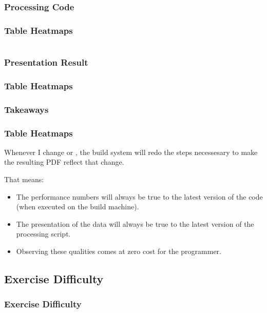{\subsubsection{Processing Code}
\begin{frame}[fragile]
  \frametitle{Table Heatmaps }
  \vspace{0mm}
  
  \begin{multicols}{2}
    \inputminted[fontsize=\tiny]{python}{../src/table_heatmap/process.py}
  \end{multicols}
\end{frame}

\subsubsection{Presentation Result}
\begin{frame}[fragile]
  \frametitle{Table Heatmaps }
  \vspace{24mm}
  \scalebox{0.9}{
    
  }
\end{frame}

\subsubsection{Takeaways}
\begin{frame}[fragile]
  \frametitle{Table Heatmaps }
  \vspace{3mm}
  Whenever I change  or , the build system will redo the steps necessesary to make the resulting PDF reflect that change.
  
  \vspace{5mm}
  That means:
  \begin{itemize}
    \item The performance numbers will always be true to the latest version of the code (when executed on the build machine).
    \item The presentation of the data will always be true to the latest version of the processing script.
    \item Observing these qualities comes at zero cost for the programmer.
  \end{itemize}
\end{frame}

\subsection{Exercise Difficulty}
\begin{frame}[fragile]
  \frametitle{Exercise Difficulty}
  \vspace{3mm}
  

\end{frame}}

